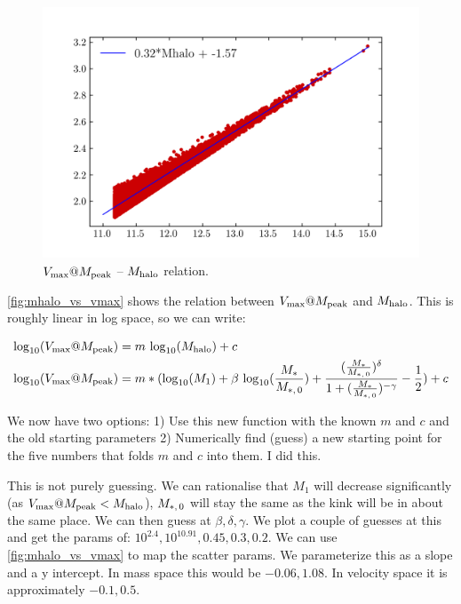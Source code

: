 \documentclass{article}
\makeatletter
\newcommand{\Mhalo}{\ensuremath{M_{\rm halo}}}
\newcommand{\vmp}{\ensuremath{V_{\rm max}@M_{\rm peak}}}
\newcommand{\tlogten}{{\rm log}_{10}}
\newcommand{\Mstar}{\ensuremath{M_{\ast}}}
\newcommand{\M}[1]{\ensuremath{M_{\ast,\,\rm #1}}}
\makeatother
\begin{document}
\begin{figure}[h]
    \includegraphics[width=\textwidth]{images/mhalo_vs_vmax.png}
    \caption{\vmp{} -- \Mhalo{} relation.
    \label{fig:mhalo_vs_vmax}
    }
\end{figure}

\autoref{fig:mhalo_vs_vmax} shows the relation between \vmp{} and \Mhalo{}. This is roughly linear in log space, so we can write:

\begin{equation}
    \begin{aligned}
        &\tlogten{}(\vmp{}) = m\ \tlogten{}(\Mhalo{}) + c \\
        &\tlogten{}(\vmp{}) = m * (\tlogten{}(M_1) + \beta~\tlogten{}(\frac{\Mstar{}}{\M{0}}) + \frac{(\frac{\Mstar{}}{\M{0}})^{\delta}}{1 + (\frac{\Mstar{}}{\M{0}})^{- \gamma}} - \frac{1}{2}) + c\\
    \end{aligned}
\end{equation}

We now have two options:
1) Use this new function with the known $m$ and $c$ and the old starting parameters
2) Numerically find (guess) a new starting point for the five numbers that folds $m$ and $c$ into them. I did this.

This is not purely guessing. We can rationalise that $M_1$ will decrease significantly (as $\vmp{} < \Mhalo{}$), $\M{0}$ will stay the same as the kink will be in about the same place. We can then guess at $\beta, \delta, \gamma$. We plot a couple of guesses at this and get the params of: $10^{2.4}, 10^{10.91}, 0.45, 0.3, 0.2$. We can use \autoref{fig:mhalo_vs_vmax} to map the scatter params. We parameterize this as a slope and a y intercept. In mass space this would be $-0.06, 1.08$. In velocity space it is approximately $-0.1, 0.5$.
\end{document}
